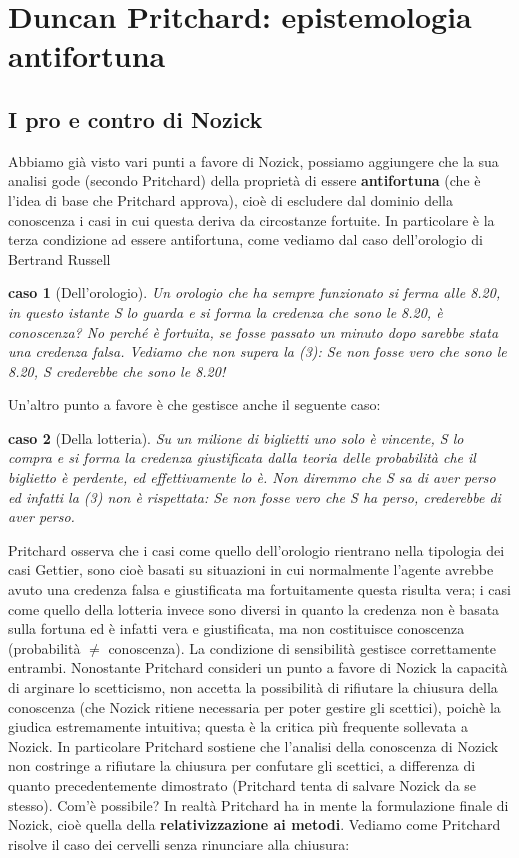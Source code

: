 \documentclass[10pt,a4paper]{article}
\newtheorem{caso}{caso}
\begin{document}
\section{Duncan Pritchard: epistemologia antifortuna}
\subsection{I pro e contro di Nozick}
Abbiamo già visto vari punti a favore di Nozick, possiamo aggiungere che la sua analisi gode (secondo Pritchard) della proprietà di essere \textbf{antifortuna} (che è l'idea di base che Pritchard approva), cioè di escludere dal dominio della conoscenza i casi in cui questa deriva da circostanze fortuite. In particolare è la terza condizione ad essere antifortuna, come vediamo dal caso dell'orologio di Bertrand Russell
\begin{caso}[Dell'orologio]
	Un orologio che ha sempre funzionato si ferma alle 8.20, in questo istante S lo guarda e si forma la credenza che sono le 8.20, è conoscenza? No perché è fortuita, se fosse passato un minuto dopo sarebbe stata una credenza falsa. Vediamo che non supera la (3): Se non fosse vero che sono le 8.20, S crederebbe che sono le 8.20!
\end{caso}
Un'altro punto a favore è che gestisce anche il seguente caso:
\begin{caso}[Della lotteria]
	Su un milione di biglietti uno solo è vincente, S lo compra e si forma la credenza giustificata dalla teoria delle probabilità che il biglietto è perdente, ed effettivamente lo è. Non diremmo che S sa di aver perso ed infatti la (3) non è rispettata: Se non fosse vero che S ha perso,  crederebbe di aver perso. 
\end{caso}
Pritchard osserva che i casi come quello dell'orologio rientrano nella tipologia dei casi Gettier, sono cioè basati su situazioni in cui normalmente l'agente avrebbe avuto una credenza falsa e giustificata ma fortuitamente questa risulta vera; i casi come quello della lotteria invece sono diversi in quanto la credenza non è basata sulla fortuna ed è infatti vera e giustificata, ma non costituisce conoscenza (probabilità $\neq$ conoscenza). La condizione di sensibilità gestisce correttamente entrambi. 
Nonostante Pritchard consideri un punto a favore di Nozick la capacità di arginare lo scetticismo, non accetta la possibilità di rifiutare la chiusura della conoscenza (che Nozick ritiene necessaria per poter gestire gli scettici), poichè la giudica estremamente intuitiva; questa è la critica più frequente sollevata a Nozick. In particolare Pritchard sostiene che l'analisi della conoscenza di Nozick non costringe a rifiutare la chiusura per confutare gli scettici, a differenza di quanto precedentemente dimostrato (Pritchard tenta di salvare Nozick da se stesso). Com'è possibile? In realtà Pritchard ha in mente la formulazione finale di Nozick, cioè quella della \textbf{relativizzazione ai metodi}. Vediamo come Pritchard risolve il caso dei cervelli senza rinunciare alla chiusura:
\end{document}
